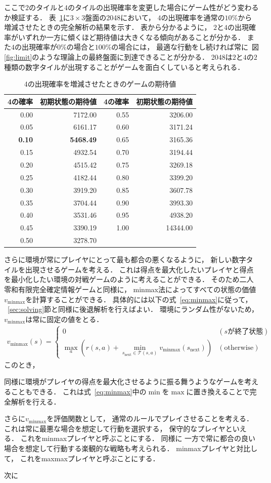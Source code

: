 ここで$2$のタイルと$4$のタイルの出現確率を変更した場合にゲーム性がどう変わるか検証する．
表~\ref{table: value_table}に$3 \times 3$盤面の2048において， $4$の出現確率を通常の$10\%$から増減させたときの完全解析の結果を示す．
表から分かるように， $2$と$4$の出現確率がいずれか一方に傾くほど期待値は大きくなる傾向があることが分かる．
また$4$の出現確率が$0\%$の場合と$100\%$の場合には， 最適な行動をし続ければ常に~図\ref{fig:limit}のような理論上の最終盤面に到達できることが分かる．
2048は$2$と$4$の$2$種類の数字タイルが出現することがゲームを面白くしていると考えられる．
\begin{table}[t]
\caption{4の出現確率を増減させたときのゲームの期待値}
\label{table: value_table}
\centering
\begin{tabular}{r|r||r|r}
    \hline 
    4の確率 & 初期状態の期待値 & 4の確率 & 初期状態の期待値 \\ \hline \hline
    0.00 & 7172.00 & 0.55 & 3206.00 \\
    0.05 & 6161.17 & 0.60 & 3171.24 \\
    \textbf{0.10} & \textbf{5468.49} & 0.65 & 3165.36 \\
    0.15 & 4932.54 & 0.70 & 3194.44 \\
    0.20 & 4515.42 & 0.75 & 3269.18 \\
    0.25 & 4182.44 & 0.80 & 3399.20 \\
    0.30 & 3919.20 & 0.85 & 3607.78 \\
    0.35 & 3704.44 & 0.90 & 3993.30 \\
    0.40 & 3531.46 & 0.95 & 4938.20 \\
    0.45 & 3390.19 & 1.00 & 14344.00 \\
    0.50 & 3278.70 &  & \\
    \hline
\end{tabular}
\end{table}

さらに環境が常にプレイヤにとって最も都合の悪くなるように， 新しい数字タイルを出現させるゲームを考える．
これは得点を最大化したいプレイヤと得点を最小化したい環境の対戦ゲームのように考えることができる．
そのため二人零和有限完全確定情報ゲームと同様に， minmax法によってすべての状態の価値$v_{\text{minmax}}$を計算することができる．
具体的には以下の式~\ref{eq:minmax}に従って， ~\ref{sec:solving}節と同様に後退解析を行えばよい．
環境にランダム性がないため， $v_{\text{minmax}}$は常に固定の値をとる．
\begin{align}
    v_{\text{minmax}}(s) =
    \begin{cases}
        0 & (s \text{が終了状態}) \\
        \max_a \left(r(s,a) + \min_{s_\text{next} \in \mathcal{T}(s,a)} v_{\text{minmax}}(s_\text{next}) \right) & (\text{otherwise})
    \end{cases}
    \label{eq:minmax}
\end{align}
このとき， 

同様に環境がプレイヤの得点を最大化させるように振る舞うようなゲームを考えることもできる．
これは式~\ref{eq:minmax}中の$\min$を$\max$に置き換えることで完全解析を行える．

さらに$v_{\text{minmax}}$を評価関数として， 通常のルールでプレイさせることを考える．
これは常に最悪な場合を想定して行動を選択する， 保守的なプレイヤといえる．
これをminmaxプレイヤと呼ぶことにする．
同様に
一方で常に都合の良い場合を想定して行動する楽観的な戦略も考えられる．
minmaxプレイヤと対比して， これをmaxmaxプレイヤと呼ぶことにする．

次に